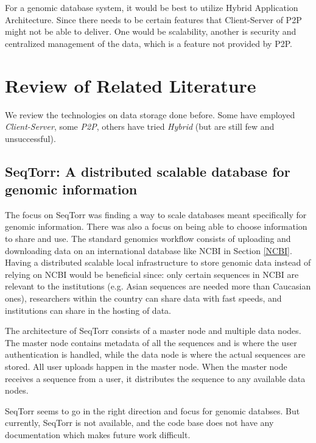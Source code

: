 \documentclass[acmsmall]{acmart}
\begin{document}
For a genomic database system, it would be best to utilize Hybrid Application Architecture. Since there needs to be certain features that Client-Server of P2P might not be able to deliver. One would be scalability, another is security and centralized management of the data, which is a feature not provided by P2P.


\section{Review of Related Literature}

We review the technologies on data storage done before. Some have employed \textit{Client-Server}, some \textit{P2P}, others have tried \textit{Hybrid} (but are still few and unsuccessful).

\subsection{SeqTorr: A distributed scalable database for genomic information}
The focus on SeqTorr was finding a way to scale databases meant specifically for genomic information. There was also a focus on being able to choose information to share and use. The standard genomics workflow consists of uploading and downloading data on an international database like NCBI in Section \ref{NCBI}. Having a distributed scalable local infrastructure to store genomic data instead of relying on NCBI would be beneficial since: only certain sequences in NCBI are relevant to the institutions (e.g. Asian sequences are needed more than Caucasian ones), researchers within the country can share data with fast speeds, and  institutions can share in the hosting of data.

The architecture of SeqTorr consists of a master node and multiple data nodes. The master node contains metadata of all the sequences and is where the user authentication is handled, while the data node is where the actual sequences are stored. All user uploads happen in the master node. When the master node receives a sequence from a user, it distributes the sequence to any available data nodes. 
\cite{seqtorr}

SeqTorr seems to go in the right direction and focus for genomic databses. But currently, SeqTorr is not available, and the code base does not have any documentation which makes future work difficult.
\end{document}
